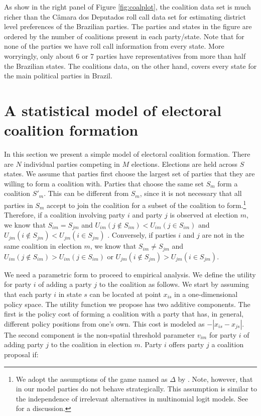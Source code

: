 As show in the right panel of Figure \ref{fig:coalplot}, the coalition data set is much richer than the Câmara dos Deputados roll call data set for estimating district level preferences of the Brazilian parties. The parties and states in the figure are ordered by the number of coalitions present in each party/state. Note that for none of the parties we have roll call information from every state. More worryingly, only about 6 or 7 parties have representatives from more than half the Brazilian states. The coalitions data, on the other hand, covers every state  for the main political parties in Brazil. 



\section{A statistical model of electoral coalition formation}

In this  section we present a simple model of electoral coalition formation. There are $N$ individual parties competing in $M$ elections. Elections are held across $S$ states. We assume that parties first choose the largest set of parties that they are willing to form a coalition with. Parties that choose the same set $S_m$ form a coalition  $S'_m$. This can be  different from $S_m$, since it is not necessary that all parties in $S_m$  accept to join the coalition for a subset of the coalition to form.\footnote{We adopt the assumptions of the game named as  $\Delta$  by \citet{hart:1983}. Note, however, that in our model parties do not behave strategically. This assumption is similar to the independence of irrelevant alternatives in multinomial logit models. See \citet{train:2003} for a discussion.} Therefore, if  a coalition involving party $i$ and party $j$ is observed at election $m$, we know that $S_{im}=S_{jm}$ and $U_{im}(j\not\in S_{im})<U_{im}(j\in S_{im})$ and $U_{jm}(i\not\in S_{jm})<U_{jm}(i\in S_{jm})$ . Conversely, if parties $i$ and $j$ are not in the same coalition in  election $m$, we know that $S_{im} \neq S_{jm}$ and $U_{im}(j\not\in S_{im})>U_{im}(j\in S_{im})$  or $U_{jm}(i\not\in S_{jm})>U_{jm}(i\in S_{jm})$.   

We need a parametric form to proceed to empirical analysis. We define the utility for party $i$ of adding a party $j$ to the coalition as follows. We start by assuming that each party $i$ in state $s$ can be located at point $x_{is}$ in a one-dimensional policy space.  The utility function we propose has two additive components. The first is  the policy cost of forming a coalition with a party that has, in general, different policy positions from one's own. This cost is modeled as $-|x_{is}-x_{js}|$.  The second component is the non-spatial threshold parameter $v_{im}$ for party $i$ of adding party $j$ to the coalition in election $m$.  Party $i$ offers party $j$ a coalition proposal if:

